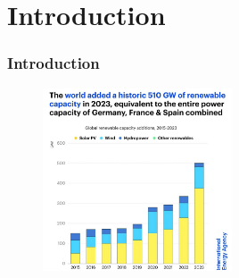 \documentclass[aspectratio=169]{beamer}
\subtitle{\vspace{-3em}Integration Costs of Variable Renewable Energy Technologies in European Energy Systems}
\author{Muhammad Umair Tareen, Sylvain Quoilin}
\institute{University of Liège}
\date{ECOS, Paris - June 30, 2025}
\begin{document}
\titleframe





\section{Introduction}

\begin{frame}{\insertsectionhead}
  \frametitle{Introduction}
  \begin{figure}
    \centering
    \includegraphics[width=0.5\textwidth]{global.png}
  \end{figure}
\end{frame}
\end{document}
